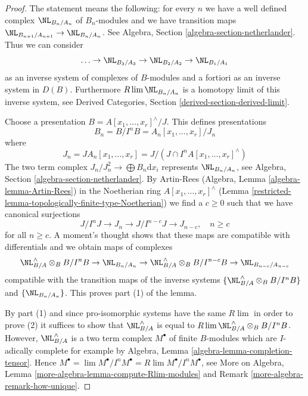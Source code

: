 \begin{proof}

The statement means the following: for every $n$ we have a well
defined complex $\NL_{B_n/A_n}$ of $B_n$-modules and we have
transition maps $\NL_{B_{n + 1}/A_{n + 1}} \to \NL_{B_n/A_n}$.
See Algebra, Section \ref{algebra-section-netherlander}.
Thus we can consider
$$
\ldots \to \NL_{B_3/A_3} \to \NL_{B_2/A_2} \to \NL_{B_1/A_1}
$$
as an inverse system of complexes of $B$-modules and a fortiori as
an inverse system in $D(B)$. Furthermore $R\lim \NL_{B_n/A_n}$
is a homotopy limit of this inverse system, see
Derived Categories, Section \ref{derived-section-derived-limit}.

\medskip\noindent
Choose a presentation $B = A[x_1, \ldots, x_r]^\wedge / J$. This
defines presentations
$$
B_n = B/I^nB = A_n[x_1, \ldots, x_r]/J_n
$$
where
$$
J_n = JA_n[x_1, \ldots, x_r] =
J/(J \cap I^nA[x_1, \ldots, x_r]^\wedge)
$$
The two term complex $J_n/J_n^2 \longrightarrow \bigoplus B_n \text{d}x_i$
represents $\NL_{B_n/A_n}$, see
Algebra, Section \ref{algebra-section-netherlander}.
By Artin-Rees (Algebra, Lemma \ref{algebra-lemma-Artin-Rees})
in the Noetherian ring $A[x_1, \ldots, x_r]^\wedge$
(Lemma \ref{restricted-lemma-topologically-finite-type-Noetherian})
we find a $c \geq 0$ such that we have canonical surjections
$$
J/I^nJ \to J_n \to J/I^{n - c}J \to J_{n - c},\quad n \geq c
$$
for all $n \geq c$. A moment's thought shows that these maps are
compatible with differentials and we obtain maps of complexes
$$
\NL_{B/A}^\wedge \otimes_B B/I^nB \to
\NL_{B_n/A_n} \to
\NL_{B/A}^\wedge \otimes_B B/I^{n - c}B \to
\NL_{B_{n - c}/A_{n - c}}
$$
compatible with the transition maps of the inverse systems
$\{\NL_{B/A}^\wedge \otimes_B B/I^nB\}$ and $\{\NL_{B_n/A_n}\}$.
This proves part (1) of the lemma.

\medskip\noindent
By part (1) and since pro-isomorphic
systems have the same $R\lim$ in order to prove (2)
it suffices to show that $\NL_{B/A}^\wedge$ is
equal to $R\lim \NL_{B/A}^\wedge \otimes_B B/I^nB$.
However, $\NL_{B/A}^\wedge$ is a two term complex $M^\bullet$
of finite $B$-modules which are $I$-adically complete for example by
Algebra, Lemma \ref{algebra-lemma-completion-tensor}. Hence
$M^\bullet = \lim M^\bullet/I^nM^\bullet = R\lim M^\bullet/I^n M^\bullet$, see
More on Algebra, Lemma \ref{more-algebra-lemma-compute-Rlim-modules} and
Remark \ref{more-algebra-remark-how-unique}.
\end{proof}

